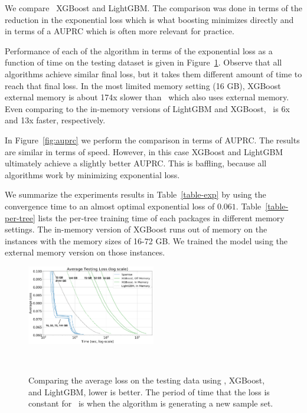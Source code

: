We compare \Sparrow\ XGBoost and LightGBM. The comparison was done in
terms of the reduction in the exponential loss which is what boosting
minimizes directly and in terms of a AUPRC which is often more
relevant for practice.

Performance of each of the algorithm in terms of
the exponential loss as a function of time on the testing dataset is given in
Figure~\ref{fig:loss}. Observe that all algorithms achieve similar
final loss, but it takes them different amount of time to reach that
final loss.
In the most limited memory setting (16 GB),
XGBoost external memory is about 174x
 slower than \Sparrow\ which also uses external memory.
Even comparing to the in-memory versions of LightGBM and XGBoost,
\Sparrow\ is 6x and 13x faster, respectively.

In Figure~\ref{fig:auprc} we perform the comparison in terms of
AUPRC. The results are similar in terms of speed. However, in this
case XGBoost and LightGBM ultimately achieve a slightly better
AUPRC. This is baffling, because all algorithms work by minimizing
exponential loss.

We summarize the experiments results in Table~\ref{table-exp} by
using the convergence time to an almost optimal exponential loss of $0.061$.
Table~\ref{table-per-tree} lists the per-tree training time of each packages
in different memory settings.
The in-memory version of XGBoost runs out of memory on the instances with
the memory sizes of 16-72 GB. We trained the model using the external memory
version on those instances.

\begin{figure}[t]
    \centering
    \includegraphics[width=0.5\textwidth]{figs/splice-loss2m.png}
    \caption{Comparing the average loss on the testing data using \Sparrow, XGBoost, and LightGBM, lower is better.
        The period of time that the loss is constant for \Sparrow\ is when the algorithm is generating a new sample set.}~\label{fig:loss}
\end{figure}

